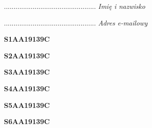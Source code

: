 \begin{turn}{90}\begin{minipage}{\linewidth} \vspace{20mm} ................................................  \textit{Imię i nazwisko}\end{minipage}\end{turn}

\begin{turn}{90}\begin{minipage}{\linewidth} \vspace{20mm} ................................................  \textit{Adres e-mailowy}\end{minipage}\end{turn}

\begin{turn}{90}\huge \begin{minipage}{\linewidth} \vspace{10mm}\textbf{S1AA19139C}\end{minipage}\end{turn}

\begin{turn}{90}\huge \begin{minipage}{\linewidth} \vspace{10mm}\textbf{S2AA19139C}\end{minipage}\end{turn}

\begin{turn}{90}\huge \begin{minipage}{\linewidth} \vspace{10mm}\textbf{S3AA19139C}\end{minipage}\end{turn}

\begin{turn}{90}\huge \begin{minipage}{\linewidth} \vspace{10mm}\textbf{S4AA19139C}\end{minipage}\end{turn}

\begin{turn}{90}\huge \begin{minipage}{\linewidth} \vspace{10mm}\textbf{S5AA19139C}\end{minipage}\end{turn}

\begin{turn}{90}\huge \begin{minipage}{\linewidth} \vspace{10mm}\textbf{S6AA19139C}\end{minipage}\end{turn}

